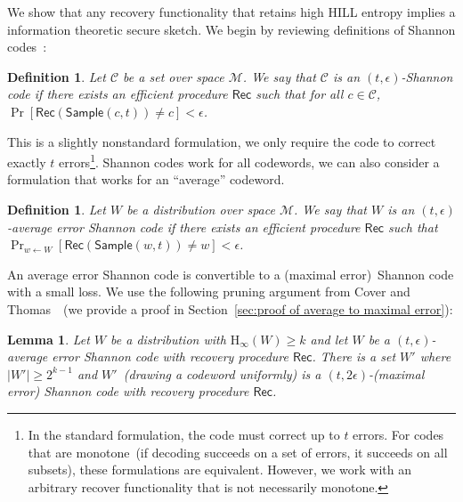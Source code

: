 \documentclass[11pt]{article}
\newcommand{\secref}[1]{\mbox{Section~\ref{#1}}}
\newcommand{\class}[1]{{\ensuremath{\mathsf{#1}}}}
\newcommand{\rec}{\ensuremath{\class{Rec}}\xspace}
\newcommand{\sample}{\ensuremath{\class{Sample}}\xspace}
\newcommand{\Hoo}{\mathrm{H}_\infty}
\newtheorem{lemma}[theorem]{Lemma}
\newtheorem{definition}[theorem]{Definition}
\begin{document}
We show that any recovery functionality that retains high HILL entropy implies a information theoretic secure sketch.  We begin by reviewing definitions of Shannon codes~\cite{shannon1949mathematical}:
\begin{definition}
Let $\mathcal{C}$ be a set over space $\mathcal{M}$.  We say that $\mathcal{C}$ is an $(t,\epsilon)$-\emph{Shannon code} if there exists an efficient procedure $\rec$ such that for all $c\in \mathcal{C}$, $\Pr[\rec(\sample(c, t)) \neq c]<\epsilon$.
\end{definition}
This is a slightly nonstandard formulation, we only require the code to correct exactly $t$ errors\footnote{In the standard formulation, the code must correct up to $t$ errors.  For codes that are monotone~(if decoding succeeds on a set of errors, it succeeds on all subsets), these formulations are equivalent.  However, we work with an arbitrary recover functionality that is not necessarily monotone.}.  Shannon codes work for all codewords, we can also consider a formulation that works for an ``average'' codeword.
\begin{definition}
Let $W$ be a distribution over space $\mathcal{M}$.  We say that $W$ is an $(t,\epsilon)$-\emph{average error Shannon code} if there exists an efficient procedure $\rec$ such that 
$\Pr_{w\leftarrow W}[\rec(\sample(w, t)) \neq w]<\epsilon$.
\end{definition}
An average error Shannon code is convertible to a (maximal error)~Shannon code with a small loss.  We use the following pruning argument from Cover and Thomas~\cite[Pages 202-204]{cover2006elements}~(we provide a proof in \secref{sec:proof of average to maximal error}):
\begin{lemma}
\label{lem:averageToMaximalError}
Let $W$ be a distribution with $\Hoo(W)\geq k$ and let $W$ be a $(t, \epsilon)$-average error Shannon code with recovery procedure $\rec$.  There is a set $W'$ where $|W'|\ge2^{k-1}$ and $W'$~(drawing a codeword uniformly) is a $(t, 2\epsilon)$-(maximal error) Shannon code with recovery procedure $\rec$.
\end{lemma}
\end{document}
